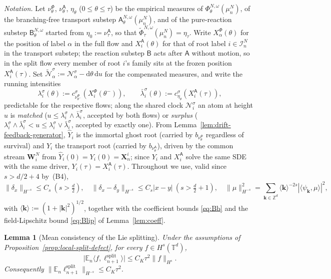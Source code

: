 \documentclass[a4paper,fleqn]{cas-sc}
\newtheorem{lemma}[theorem]{Lemma}
\theoremstyle{definition}
\theoremstyle{remark}
\begin{document}
\emph{Notation.} Let $\nu^\Phi_\theta$, $\nu^{\mathsf A}_\theta$, $\eta_\theta$
($0\le\theta\le\tau$) be the empirical measures of $\Phi^{N,\omega}_\theta(\mu^N_n)$,
of the branching-free transport substep $\mathsf A^{N,\omega}_\theta(\mu^N_n)$, and of
the pure-reaction substep $\mathsf B^{N,\omega}_\theta$ started from
$\eta_0:=\nu^{\mathsf A}_\tau$, so that $\widetilde\Phi^{N,\omega}_\tau(\mu^N_n)=\eta_\tau$.
Write $X^\Phi_\alpha(\theta)$ for the position of label $\alpha$ in the full flow and
$X^{\mathsf A}_i(\theta)$ for that of root label $i\in\mathcal I^N_n$ in the transport
substep; the reaction substep $\mathsf B$ acts after $\mathsf A$ without motion, so in
the split flow every member of root $i$'s family sits at the frozen position
$X^{\mathsf A}_i(\tau)$. Set
$\widetilde{\mathcal N}^{\sigma}_\alpha:=\mathcal N^{\sigma}_\alpha-\mathrm d\theta\,\mathrm du$
for the compensated measures, and write the running intensities
\[
\lambda^\sigma_i(\theta):=c^\sigma_{\nu^\Phi_{\theta^-}}(X^\Phi_i(\theta^-)),
\qquad
\bar\lambda^\sigma_i(\theta):=c^\sigma_{\eta_\theta}(X^{\mathsf A}_i(\tau)),
\]
predictable for the respective flows; along the shared clock $\mathcal N^\sigma_i$ an
atom at height $u$ is \emph{matched} ($u\le\lambda^\sigma_i\wedge\bar\lambda^\sigma_i$,
accepted by both flows) or \emph{surplus}
($\lambda^\sigma_i\wedge\bar\lambda^\sigma_i<u\le\lambda^\sigma_i\vee\bar\lambda^\sigma_i$,
accepted by exactly one). From Lemma~\ref{lem:drift-feedback-generator}, $\widehat Y_i$
is the immortal ghost root (carried by $b_{\nu^\Phi_\theta}$ regardless of survival) and
$Y_i$ the transport root (carried by $b_{\nu^{\mathsf A}_\theta}$), driven by the common
stream $\mathbf W^N_i$ from $\widehat Y_i(0)=Y_i(0)=\mathbf X^i_n$; since $Y_i$ and
$X^{\mathsf A}_i$ solve the same SDE with the same driver, $Y_i(\tau)=X^{\mathsf A}_i(\tau)$.
Throughout we use, valid since $s>d/2+4$ by~(B4),
\begin{equation}\label{eq:ls-sobolev}
\|\delta_x\|_{H^{-s}}\le C_s\ (s>\tfrac d2),
\quad
\|\delta_x-\delta_y\|_{H^{-s}}\le C_s|x-y|\ (s>\tfrac d2+1),
\quad
\|\mu\|_{H^{-s}}^2=\sum_{\mathbf k\in\mathbb Z^d}\langle\mathbf k\rangle^{-2s}|\langle\psi_{\mathbf k},\mu\rangle|^2,
\end{equation}
with $\langle\mathbf k\rangle:=(1+|\mathbf k|^2)^{1/2}$, together with the coefficient
bounds \eqref{eq:Bb} and the field-Lipschitz bound \eqref{eq:Blip} of
Lemma~\ref{lem:coeff}.

\begin{lemma}[Mean consistency of the Lie splitting]\label{lem:split-mean}
Under the assumptions of Proposition~\ref{prop:local-split-defect}, for every
$f\in H^s(\mathbb T^d)$,
\[
\bigl|\mathbb E_n\langle f,\ell^{\mathrm{split}}_{n+1}\rangle\bigr|\le C_K\tau^2\|f\|_{H^s}.
\]
Consequently $\|\mathbb E_n\ell^{\mathrm{split}}_{n+1}\|_{H^{-s}}\le C_K\tau^2$.
\end{lemma}
\end{document}

